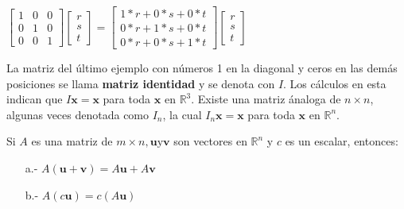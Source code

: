 \documentclass{article}
\begin{document}
$\begin{bmatrix}
    1 & 0 & 0\\
    0 & 1 & 0\\
    0 & 0 & 1
\end{bmatrix}
\begin{bmatrix} r\\s\\t \end{bmatrix}
=\begin{bmatrix}
    1*r + 0*s + 0*t\\
    0*r + 1*s + 0*t\\
    0*r + 0*s + 1*t
\end{bmatrix}
\begin{bmatrix} r\\s\\t \end{bmatrix}$

La matriz del último ejemplo con números 1 en la diagonal y ceros en las demás posiciones se llama \textbf{matriz identidad} y se denota con $I$. Los cálculos en esta indican que $I\mathbf{x} =  \mathbf{x}$ para toda $\mathbf{x}$ en $\mathbb{R}^3$. Existe una matriz ánaloga de $n \times n$, algunas veces denotada como $I_n$, la cual $I_n\mathbf{x} = \mathbf{x}$ para toda $\mathbf{x}$ en $\mathbb{R}^n$.

\begin{tcolorbox}[colback=red!10!white, colframe=red!70!black, title=Propiedades del producto matriz-vector $A\mathbf{x}$]
    Si $A$ es una matriz de $m\times n, \mathbf{u} \text{y} \mathbf{v}$ son vectores en $\mathbb{R}^n$ y $c$ es un escalar, entonces: 
    \begin{itemize}
        \item[a.-]  $A(\mathbf{u} + \mathbf{v}) = A\mathbf{u} + A\mathbf{v}$
        \item[b.-] $A(c\mathbf{u}) = c(A\mathbf{u})$ 
    \end{itemize}

\end{tcolorbox}
\end{document}
